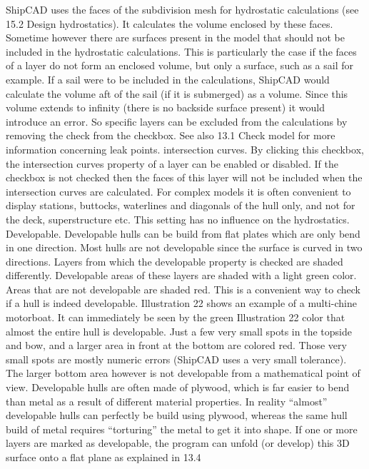 \documentclass[12pt]{article}
\begin{document}
ShipCAD uses the faces of the subdivision mesh for hydrostatic calculations (see 15.2
Design hydrostatics). It calculates the volume enclosed by these faces. Sometime however
there are surfaces present in the model that should not be included in the hydrostatic
calculations. This is particularly the case if the faces of a layer do not form an enclosed
volume, but only a surface, such as a sail for example. If a sail were to be included in the
calculations, ShipCAD would calculate the volume aft of the sail (if it is submerged) as a
volume. Since this volume extends to infinity (there is no backside surface present) it would
introduce an error. So specific layers can be excluded from the calculations by removing the
check from the checkbox. See also 13.1 Check model for more information concerning leak
points.
intersection curves.
By clicking this checkbox, the intersection curves property of a layer can be enabled or
disabled. If the checkbox is not checked then the faces of this layer will not be included
when the intersection curves are calculated. For complex models it is often convenient to
display stations, buttocks, waterlines and diagonals of the hull only, and not for the deck,
superstructure etc. This setting has no influence on the hydrostatics.
Developable.
Developable hulls can be build
from flat plates which are only
bend in one direction. Most hulls
are not developable since the
surface is curved in two directions.
Layers from which the developable
property is checked are shaded
differently. Developable areas of
these layers are shaded with a light
green color. Areas that are not
developable are shaded red. This
is a convenient way to check if a
hull is indeed developable.
Illustration 22 shows an example of
a multi-chine motorboat. It can
immediately be seen by the green
Illustration 22
color that almost the entire hull is
developable. Just a few very small spots in the topside and bow, and a larger area in front at
the bottom are colored red. Those very small spots are mostly numeric errors (ShipCAD
uses a very small tolerance). The larger bottom area however is not developable from a
mathematical point of view. Developable hulls are often made of plywood, which is far easier
to bend than metal as a result of different material properties. In reality “almost” developable
hulls can perfectly be build using plywood, whereas the same hull build of metal requires
“torturing” the metal to get it into shape. If one or more layers are marked as developable,
the program can unfold (or develop) this 3D surface onto a flat plane as explained in 13.4
\end{document}
